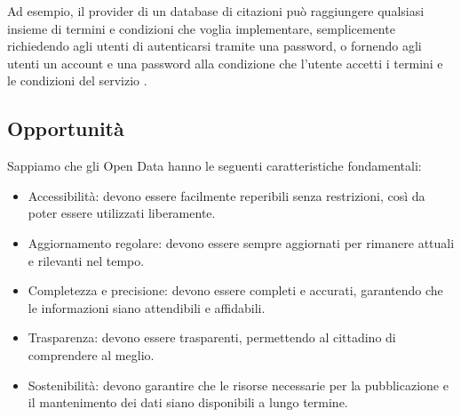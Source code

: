 Ad esempio, il provider di un database di citazioni può raggiungere qualsiasi insieme di termini e condizioni che voglia implementare, semplicemente richiedendo agli utenti di autenticarsi tramite una password, o fornendo agli utenti un account e una password alla condizione che l'utente accetti i termini e le condizioni del servizio \cite{OpenDataHandbook_LegalRights}.





\subsection{Opportunità}
Sappiamo che gli Open Data hanno le seguenti caratteristiche fondamentali:
\begin{itemize}
    \item Accessibilità: devono essere facilmente reperibili senza restrizioni, così da poter essere utilizzati liberamente.
    \item Aggiornamento regolare: devono essere sempre aggiornati per rimanere attuali e rilevanti nel tempo.
    \item Completezza e precisione: devono essere completi e accurati, garantendo che le informazioni siano attendibili e affidabili.
    \item Trasparenza: devono essere trasparenti, permettendo al cittadino di comprendere al meglio.
    \item Sostenibilità: devono garantire che le risorse necessarie per la pubblicazione e il mantenimento dei dati siano disponibili a lungo termine.
\end{itemize}

